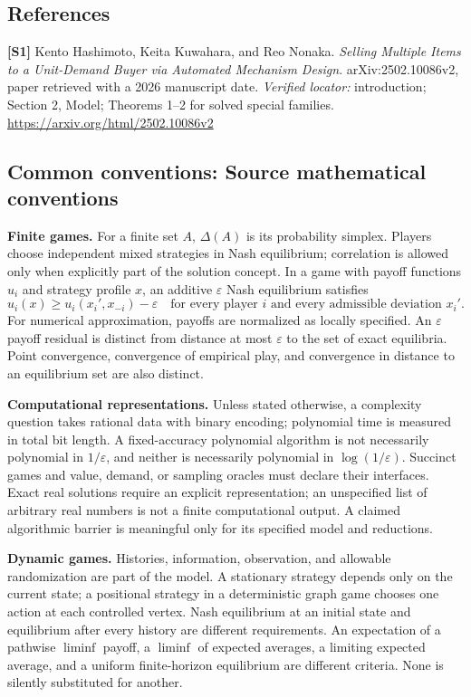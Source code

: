 \documentclass[11pt,a4paper]{article}
\begin{document}
\subsection*{References}
\begingroup\footnotesize\raggedright
\textbf{[S1]} Kento Hashimoto, Keita Kuwahara, and Reo Nonaka. \emph{Selling Multiple Items to a Unit-Demand Buyer via Automated Mechanism Design}. arXiv:2502.10086v2, paper retrieved with a 2026 manuscript date. \textit{Verified locator:} introduction; Section 2, Model; Theorems 1--2 for solved special families. \url{https://arxiv.org/html/2502.10086v2}
\par\endgroup

\subsection*{Common conventions: Source mathematical conventions}

\textbf{Finite games.} For a finite set $A$, $\Delta(A)$ is its probability
simplex. Players choose independent mixed strategies in Nash equilibrium;
correlation is allowed only when explicitly part of the solution concept.
In a game with payoff functions $u_i$ and strategy profile $x$, an additive
$\varepsilon$ Nash equilibrium satisfies
\[
 u_i(x)\geq u_i(x_i',x_{-i})-\varepsilon
 \quad\text{for every player $i$ and every admissible deviation $x_i'$}.
\]
For numerical approximation, payoffs are normalized as locally specified.
An $\varepsilon$ payoff residual is distinct from distance at most
$\varepsilon$ to the set of exact equilibria. Point convergence, convergence
of empirical play, and convergence in distance to an equilibrium set are
also distinct.

\textbf{Computational representations.} Unless stated otherwise, a complexity
question takes rational data with binary encoding; polynomial time is measured
in total bit length. A fixed-accuracy polynomial algorithm is not necessarily
polynomial in $1/\varepsilon$, and neither is necessarily polynomial in
$\log(1/\varepsilon)$. Succinct games and value, demand, or sampling oracles
must declare their interfaces. Exact real solutions require an explicit
representation; an unspecified list of arbitrary real numbers is not a
finite computational output. A claimed algorithmic barrier is meaningful
only for its specified model and reductions.

\textbf{Dynamic games.} Histories, information, observation, and allowable
randomization are part of the model. A stationary strategy depends only on
the current state; a positional strategy in a deterministic graph game
chooses one action at each controlled vertex. Nash equilibrium at an initial
state and equilibrium after every history are different requirements.
An expectation of a pathwise $\liminf$ payoff, a $\liminf$ of expected averages,
a limiting expected average, and a uniform finite-horizon equilibrium are
different criteria. None is silently substituted for another.
\end{document}
